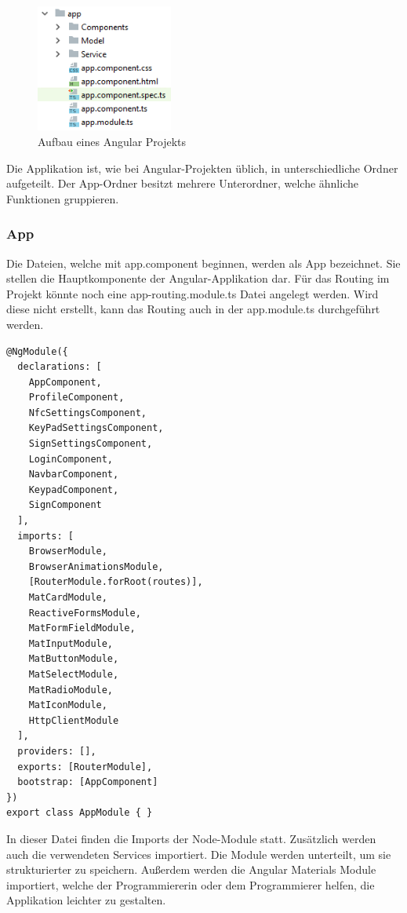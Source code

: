 \begin{figure}[h]
    \centering
    \includegraphics[width=0.4\textwidth]{pics/Aufbau_Angular.png}
    \caption{Aufbau eines Angular Projekts}
    \end{figure}

Die Applikation ist, wie bei Angular-Projekten üblich, in unterschiedliche Ordner aufgeteilt. Der App-Ordner besitzt mehrere Unterordner, welche ähnliche Funktionen gruppieren.

\subsubsection{App}
Die Dateien, welche mit app.component beginnen, werden als App bezeichnet. Sie stellen die Hauptkomponente der Angular-Applikation dar. Für das Routing im Projekt könnte noch eine app-routing.module.ts Datei angelegt werden. Wird diese nicht erstellt, kann das Routing auch in der app.module.ts durchgeführt werden.

\begin{lstlisting}[caption=app.module.ts]
    @NgModule({
  declarations: [
    AppComponent,
    ProfileComponent,
    NfcSettingsComponent,
    KeyPadSettingsComponent,
    SignSettingsComponent,
    LoginComponent,
    NavbarComponent,
    KeypadComponent,
    SignComponent
  ],
  imports: [
    BrowserModule,
    BrowserAnimationsModule,
    [RouterModule.forRoot(routes)],
    MatCardModule,
    ReactiveFormsModule,
    MatFormFieldModule,
    MatInputModule,
    MatButtonModule,
    MatSelectModule,
    MatRadioModule,
    MatIconModule,
    HttpClientModule
  ],
  providers: [],
  exports: [RouterModule],
  bootstrap: [AppComponent]
})
export class AppModule { }
\end{lstlisting}

In dieser Datei finden die Imports der Node-Module statt. Zusätzlich werden auch die verwendeten Services importiert. Die Module werden unterteilt, um sie strukturierter zu speichern. Außerdem werden die Angular Materials Module importiert, welche der Programmiererin oder dem Programmierer helfen, die Applikation leichter zu gestalten. 

